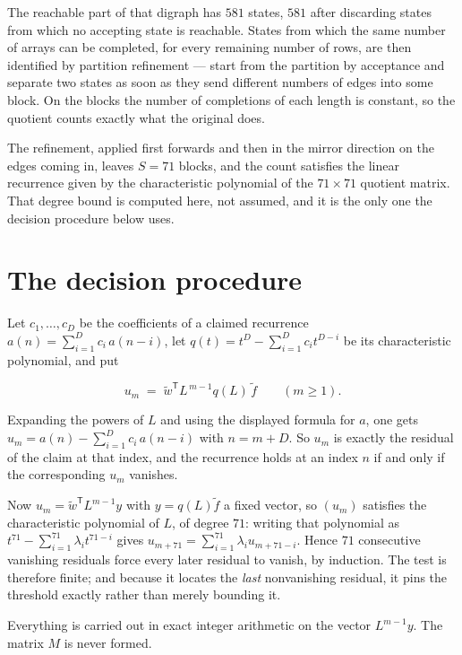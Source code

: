 \documentclass[11pt]{article}
\theoremstyle{definition}
\begin{document}
The reachable part of that digraph has $581$ states, $581$ after discarding states from which no accepting state is reachable. States from which the same number of arrays can be completed, for every remaining number of rows, are then identified by partition refinement --- start from the partition by acceptance and separate two states as soon as they send different numbers of edges into some block. On the blocks the number of completions of each length is constant, so the quotient counts exactly what the original does.

The refinement, applied first forwards and then in the mirror direction on the edges coming in, leaves $S = 71$ blocks, and the count satisfies the linear recurrence given by the characteristic polynomial of the $71 \times 71$ quotient matrix. That degree bound is computed here, not assumed, and it is the only one the decision procedure below uses.

\section{The decision procedure}

Let $c_1,\dots,c_D$ be the coefficients of a claimed recurrence $a(n) = \sum_{i=1}^{D} c_i\,a(n-i)$, let $q(t) = t^{D} - \sum_{i=1}^{D} c_i t^{D-i}$ be its characteristic polynomial, and put

\[u_m \;=\; \tilde w^{\mathsf T} L^{\,m-1} q(L)\,\tilde f \qquad (m \ge 1).\]

Expanding the powers of $L$ and using the displayed formula for $a$, one gets $u_m = a(n) - \sum_{i=1}^{D} c_i\,a(n-i)$ with $n = m + D$. So $u_m$ is exactly the residual of the claim at that index, and the recurrence holds at an index $n$ if and only if the corresponding $u_m$ vanishes.

Now $u_m = \tilde w^{\mathsf T} L^{m-1} y$ with $y = q(L)\tilde f$ a fixed vector, so $(u_m)$ satisfies the characteristic polynomial of $L$, of degree $71$: writing that polynomial as $t^{71} - \sum_{i=1}^{71} \lambda_i t^{71-i}$ gives $u_{m+71} = \sum_{i=1}^{71} \lambda_i u_{m+71-i}$. Hence $71$ consecutive vanishing residuals force every later residual to vanish, by induction. The test is therefore finite; and because it locates the {\itshape last} nonvanishing residual, it pins the threshold exactly rather than merely bounding it.

Everything is carried out in exact integer arithmetic on the vector $L^{m-1}y$. The matrix $M$ is never formed.
\end{document}
